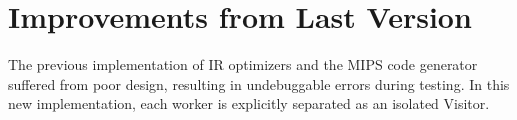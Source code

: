 \section{Improvements from Last Version}
The previous implementation of IR optimizers and the MIPS code generator suffered from poor design, resulting in undebuggable errors during testing. In this new implementation, each worker is explicitly separated as an isolated Visitor.